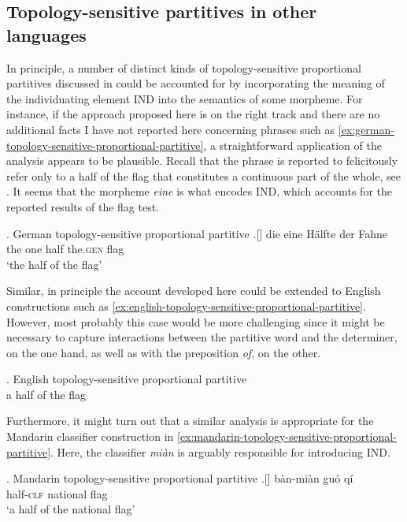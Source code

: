 	\subsection{Topology-sensitive partitives in other languages}\label{sec:topology-sensitive-partitives-in-other-languages}
	
	In principle, a number of distinct kinds of topology-sensitive proportional partitives discussed in   could be accounted for by incorporating the meaning of the individuating element IND into the semantics of some morpheme. For instance, if the approach proposed here is on the right track and there are no additional facts I have not reported here concerning phrases such as \ref{ex:german-topology-sensitive-proportional-partitive}, a straightforward application of the analysis appears to be plausible. Recall that the phrase is reported to felicitously refer only to a half of the flag that constitutes a continuous part of the whole, see . It seems that the morpheme \textit{eine} is what encodes IND, which accounts for the reported results of the flag test.
	
	\ex. German topology-sensitive proportional partitive\label{ex:german-topology-sensitive-proportional-partitive}
	\bg.[] die eine Hälfte der Fahne\\
	the one half the\textsc{.gen} flag\\
	`the half of the flag'
	
    Similar, in principle the account developed here could be extended to English constructions such as \ref{ex:english-topology-sensitive-proportional-partitive}. However, most probably this case would be more challenging since it might be necessary to capture interactions between the partitive word and the determiner, on the one hand, as well as with the preposition \textit{of}, on the other.
    
    \ex. English topology-sensitive proportional partitive\\
    a half of the flag\label{ex:english-topology-sensitive-proportional-partitive}
    
	Furthermore, it might turn out that a similar analysis is appropriate for the Mandarin classifier construction in \ref{ex:mandarin-topology-sensitive-proportional-partitive}. Here, the classifier \textit{mi{\`{a}}n} is arguably responsible for introducing IND.\pagebreak
	
	\ex. Mandarin topology-sensitive proportional partitive\label{ex:mandarin-topology-sensitive-proportional-partitive}
	\bg.[] b{\`{a}}n-mi{\`{a}}n gu{\'{o}} q{\'{i}}\\
	half-\textsc{clf} national flag\\
	`a half of the national flag'
	
